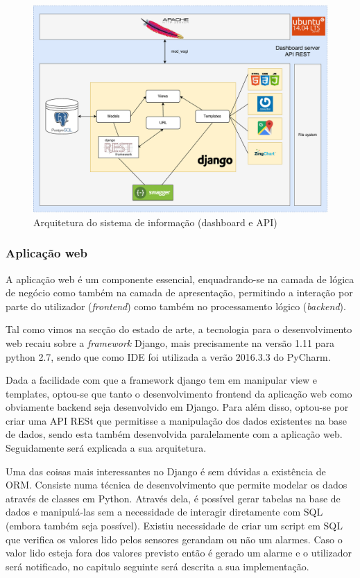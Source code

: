 \begin{figure}[h]
	\centering
	\includegraphics[width=\linewidth]{esquemas/fisica-si.pdf}
	\caption{Arquitetura do sistema de informação (dashboard e API)}
	\label{arquiteturasi}
\end{figure}


\subsubsection{Aplicação web}

A aplicação web é um componente essencial, enquadrando-se na camada de lógica de negócio como também na camada de apresentação, permitindo a interação por parte do utilizador (\textit{frontend}) como também no processamento lógico (\textit{backend}).   

Tal como vimos na secção do estado de arte, a tecnologia para o desenvolvimento web recaiu sobre a \textit{framework} Django, mais precisamente na versão 1.11 para python 2.7, sendo que como \ac{IDE} foi utilizada a verão 2016.3.3 do PyCharm.

Dada a facilidade com que a framework django tem em manipular view e templates, optou-se que tanto o desenvolvimento frontend da aplicação web como obviamente backend seja desenvolvido em Django. Para além disso, optou-se por criar uma API RESt que permitisse a manipulação dos dados existentes na base de dados, sendo esta também desenvolvida paralelamente com a aplicação web. Seguidamente será explicada a sua arquitetura.   

Uma das coisas mais interessantes no Django é sem dúvidas a existência de \ac{ORM}. Consiste numa técnica de desenvolvimento que permite modelar os dados através de classes em Python. Através dela, é possível gerar tabelas na base de dados e manipulá-las sem a necessidade de interagir diretamente com \ac{SQL} (embora também seja possível). Existiu necessidade de criar um script em \ac{SQL} que verifica os valores lido pelos sensores gerandam ou não um alarmes. Caso o valor lido esteja fora dos valores previsto então é gerado um alarme e o utilizador será notificado, no capitulo seguinte será descrita a sua implementação. 

